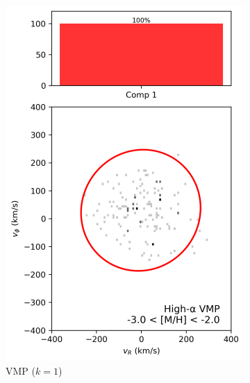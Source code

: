 \documentclass[a4paper,12pt]{article}
\begin{document}
\begin{figure}[H]
  \centering

  \begin{subfigure}{0.245\linewidth}
    \includegraphics[width=\linewidth]{../figures/gmm_vmp_high_alpha_k1.png}
    \caption{VMP ($k{=}1$)}
    \label{fig:vmp_hi}
  \end{subfigure}\hfill
  \begin{subfigure}{0.245\linewidth}

\end{subfigure}
\end{figure}
\end{document}
